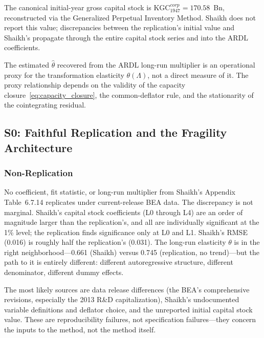 \documentclass[11pt,a4paper]{article}
\begin{document}
The canonical initial-year gross capital stock is $\text{KGC}_{1947}^{corp} = 170.58$~Bn, reconstructed via the Generalized Perpetual Inventory Method. Shaikh does not report this value; discrepancies between the replication's initial value and Shaikh's propagate through the entire capital stock series and into the ARDL coefficients.

The estimated $\hat{\theta}$ recovered from the ARDL long-run multiplier is an operational proxy for the transformation elasticity $\theta(\Lambda)$, not a direct measure of it. The proxy relationship depends on the validity of the capacity closure~\eqref{eq:capacity_closure}, the common-deflator rule, and the stationarity of the cointegrating residual.



\subsection{S0: Faithful Replication and the Fragility Architecture}
\label{subsec:S0_results}


\subsubsection{Non-Replication}

No coefficient, fit statistic, or long-run multiplier from Shaikh's Appendix Table~6.7.14 replicates under current-release BEA data. The discrepancy is not marginal. Shaikh's capital stock coefficients (L0 through L4) are an order of magnitude larger than the replication's, and all are individually significant at the 1\% level; the replication finds significance only at L0 and L1. Shaikh's RMSE (0.016) is roughly half the replication's (0.031). The long-run elasticity $\theta$ is in the right neighborhood---0.661 (Shaikh) versus 0.745 (replication, no trend)---but the path to it is entirely different: different autoregressive structure, different denominator, different dummy effects.

The most likely sources are data release differences (the BEA's comprehensive revisions, especially the 2013 R\&D capitalization), Shaikh's undocumented variable definitions and deflator choice, and the unreported initial capital stock value. These are reproducibility failures, not specification failures---they concern the inputs to the method, not the method itself.
\end{document}

